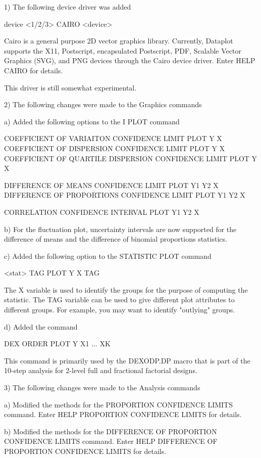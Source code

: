  1) The following device driver was added

        device <1/2/3> CAIRO <device>

    Cairo is a general purpose 2D vector graphics library.  Currently,
    Dataplot supports the X11, Postscript, encapsulated Postscript,
    PDF, Scalable Vector Graphics (SVG), and PNG devices through
    the Cairo device driver.  Enter HELP CAIRO for details.

    This driver is still somewhat experimental.

 2) The following changes were made to the Graphics commands

    a) Added the following options to the I PLOT command

         COEFFICIENT OF VARIAITON CONFIDENCE LIMIT PLOT Y X
         COEFFICIENT OF DISPERSION CONFIDENCE LIMIT PLOT Y X
         COEFFICIENT OF QUARTILE DISPERSION CONFIDENCE LIMIT PLOT Y X

         DIFFERENCE OF MEANS CONFIDENCE LIMIT PLOT Y1 Y2 X
         DIFFERENCE OF PROPORTIONS CONFIDENCE LIMIT PLOT Y1 Y2 X

         CORRELATION CONFIDENCE INTERVAL PLOT Y1 Y2 X

    b) For the fluctuation plot, uncertainty intervals are now
       supported for the difference of means and the difference
       of binomial proportions statistics.

    c) Added the following option to the STATISTIC PLOT command

          <stat> TAG PLOT Y X TAG

       The X variable is used to identify the groups for the
       purpose of computing the statistic.  The TAG variable can
       be used to give different plot attributes to different
       groups.  For example, you may want to identify "outlying"
       groups.

    d) Added the command

         DEX ORDER PLOT Y X1 ... XK

       This command is primarily used by the DEXODP.DP macro that is
       part of the 10-step analysis for 2-level full and fractional
       factorial designs.

 3) The following changes were made to the Analysis commands

    a) Modified the methods for the PROPORTION CONFIDENCE LIMITS
       command.  Enter HELP PROPORTION CONFIDENCE LIMITS for details.

    b) Modified the methods for the DIFFERENCE OF PROPORTION CONFIDENCE
       LIMITS command.  Enter HELP DIFFERENCE OF PROPORTION CONFIDENCE
       LIMITS for details.

